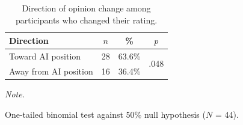 \begin{table}[h]
\centering
\caption{\label{tab:direction_change}Direction of opinion change among participants who changed their rating.}
\fontsize{10}{12}\selectfont
\begin{threeparttable}
\begin{tabular}[t]{lccc}
\toprule
Direction & $n$ & \% & $p$\\
\midrule
Toward AI position & 28 & 63.6\% & \multirow{2}{*}{.048}\\
Away from AI position & 16 & 36.4\% & \\
\bottomrule
\end{tabular}
\begin{tablenotes}
\item \textit{Note.}
\item One-tailed binomial test against 50\% null hypothesis ($N$ = 44).
\end{tablenotes}
\end{threeparttable}
\end{table}
